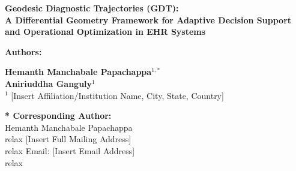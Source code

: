 \documentclass[11pt]{article}
\begin{document}
\begin{center}
    \Large\textbf{Geodesic Diagnostic Trajectories (GDT):\\
    A Differential Geometry Framework for Adaptive Decision Support\\
    and Operational Optimization in EHR Systems}
\end{center}
\vspace{2em}

\noindent\textbf{Authors:}
\vspace{1em}

\noindent \textbf{Hemanth Manchabale Papachappa}$^{1, *}$ \\
\noindent \textbf{Aniriuddha Ganguly}$^{1}$ \\

\vspace{1em}
\noindent $^{1}$ [Insert Affiliation/Institution Name, City, State, Country]

\vspace{3em}
\noindent\textbf{* Corresponding Author:} \\
Hemanth Manchabale Papachappa \\relax
[Insert Full Mailing Address] \\relax
Email: [Insert Email Address] \\relax
\end{document}
